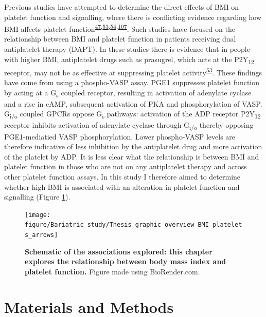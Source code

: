 \documentclass[11pt,twoside]{bristolthesis}
\begin{document}
Previous studies have attempted to determine the direct effects of BMI on platelet function and signalling, where there is conflicting evidence regarding how BMI affects platelet function\textsuperscript{\protect\hyperlink{ref-Nardin2015}{47},\protect\hyperlink{ref-Deharo2014}{53},\protect\hyperlink{ref-Sibbing2007}{54},\protect\hyperlink{ref-Barrachina2019}{107}}. Such studies have focused on the relationship between BMI and platelet function in patients receiving dual antiplatelet therapy (DAPT). In these studies there is evidence that in people with higher BMI, antiplatelet drugs such as prasugrel, which acts at the P2Y\textsubscript{12} receptor, may not be as effective at suppressing platelet activity\textsuperscript{\protect\hyperlink{ref-Deharo2014}{53}}. These findings have come from using a phospho-VASP assay. PGE1 suppresses platelet function by acting at a G\textsubscript{s} coupled receptor, resulting in activation of adenylate cyclase and a rise in cAMP, subsequent activation of PKA and phosphorylation of VASP. G\textsubscript{i/o} coupled GPCRs oppose G\textsubscript{s} pathways: activation of the ADP receptor P2Y\textsubscript{12} receptor inhibits activation of adenylate cyclase through G\textsubscript{i/o} thereby opposing PGE1-mediatied VASP phosphorylation. Lower phospho-VASP levels are therefore indicative of less inhibition by the antiplatelet drug and more activation of the platelet by ADP. It is less clear what the relationship is between BMI and platelet function in those who are not on any antiplatelet therapy and across other platelet function assays. In this study I therefore aimed to determine whether high BMI is associated with an alteration in platelet function and signalling (Figure \ref{fig:BMI-platelet-overview2}).



\begin{figure}

{\centering \texttt{[image: figure/Bariatric\_study/Thesis\_graphic\_overview\_BMI\_platelets\_arrows]} 

}

\caption[Schematic of the associations explored in the current chapter]{\textbf{Schematic of the associations explored: this chapter explores the relationship between body mass index and platelet function.} Figure made using BioRender.com.}\label{fig:BMI-platelet-overview2}
\end{figure}
\hypertarget{materials-and-methods}{%
\section{Materials and Methods}\label{materials-and-methods}}
\end{document}
